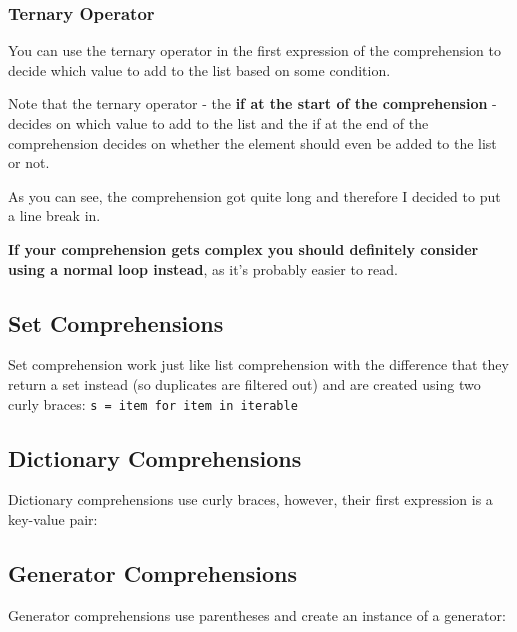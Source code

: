         \subsubsection{Ternary Operator}

            You can use the ternary operator in the first expression of the comprehension to decide
            which value to add to the list based on some condition.

            Note that the ternary operator - the \textbf{if at the start of the comprehension} -
            decides on which value to add to the list and the if at the end of the comprehension
            decides on whether the element should even be added to the list or not.


            As you can see, the comprehension got quite long and therefore I decided to put
            a line break in.

            \textbf{If your comprehension gets complex you should definitely consider using a normal
            loop instead}, as it's probably easier to read.

    \subsection{Set Comprehensions}

        Set comprehension work just like list comprehension with the difference that they return a
        set instead (so duplicates are filtered out) and are created using two curly braces:
        \texttt{s = {item for item in iterable}}

    \subsection{Dictionary Comprehensions}

        Dictionary comprehensions use curly braces, however, their first expression is a key-value
        pair:


    \subsection{Generator Comprehensions}

        Generator comprehensions use parentheses and create an instance of a generator:

